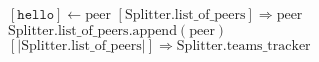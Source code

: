 \documentclass{article}
\begin{document}
\pagestyle{empty}

\newcommand{\send}{\Rightarrow}
\newcommand{\sendto}{\rightarrow}
\newcommand{\recv}{\Leftarrow}

\begin{algorithmic}

  \algrenewcommand{}
  
  \algrenewcommand{}
  \State $[\mathtt{hello}] \leftarrow \mathrm{peer}$
  \State $[\mathrm{Splitter}.\mathrm{list\_of\_peers}] \send \mathrm{peer}$
  \State $\mathrm{Splitter}.\mathrm{list\_of\_peers}.\mathrm{append}(\mathrm{peer})$
  \State $[|\mathrm{Splitter}.\mathrm{list\_of\_peers}|] \send \mathrm{\mathrm{Splitter}.teams\_tracker}$
  \EndWhile
  \EndProcedure
  
\end{algorithmic}
\end{document}
